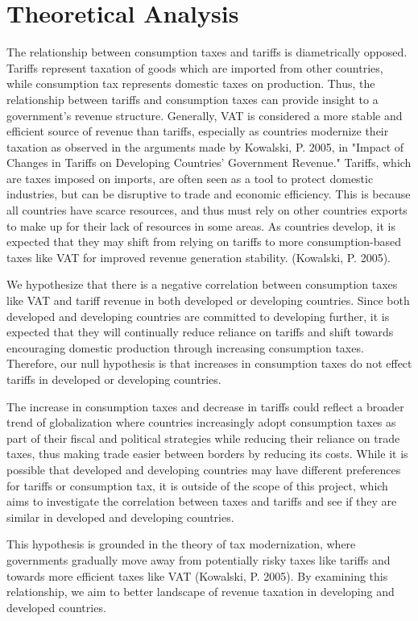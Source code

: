 \documentclass[12pt]{article}
\begin{document}
\section{Theoretical Analysis}
\label{sec:theory}
The relationship between consumption taxes and tariffs is diametrically opposed. Tariffs represent taxation of goods which are imported from other countries, while consumption tax represents domestic taxes on production. Thus, the relationship between tariffs and consumption taxes can provide insight to a government's revenue structure. Generally, VAT is considered a more stable and efficient source of revenue than tariffs, especially as countries modernize their taxation as observed in the arguments made by Kowalski, P. 2005, in "Impact of Changes in Tariffs on Developing Countries’ Government Revenue." Tariffs, which are taxes imposed on imports, are often seen as a tool to protect domestic industries, but can be disruptive to trade and economic efficiency. This is because all countries have scarce resources, and thus must rely on other countries exports to make up for their lack of resources in some areas. As countries develop, it is expected that they may shift from relying on tariffs to more consumption-based taxes like VAT for improved revenue generation stability. (Kowalski, P. 2005).

We hypothesize that there is a negative correlation between consumption taxes like VAT and tariff revenue in both developed or developing countries. Since both developed and developing countries are committed to developing further, it is expected that they will continually reduce reliance on tariffs and shift towards encouraging domestic production through increasing consumption taxes. Therefore, our null hypothesis is that increases in consumption taxes do not effect tariffs in developed or developing countries. 

The increase in consumption taxes and decrease in tariffs could reflect a broader trend of globalization where countries increasingly adopt consumption taxes as part of their fiscal and political strategies while reducing their reliance on trade taxes, thus making trade easier between borders by reducing its costs. While it is possible that developed and developing countries may have different preferences for tariffs or consumption tax, it is outside of the scope of this project, which aims to investigate the correlation between taxes and tariffs and see if they are similar in developed and developing countries.

This hypothesis is grounded in the theory of tax modernization, where governments gradually move away from potentially risky taxes like tariffs and towards more efficient taxes like VAT (Kowalski, P. 2005). By examining this relationship, we aim to better landscape of revenue taxation in developing and developed countries.
\end{document}
